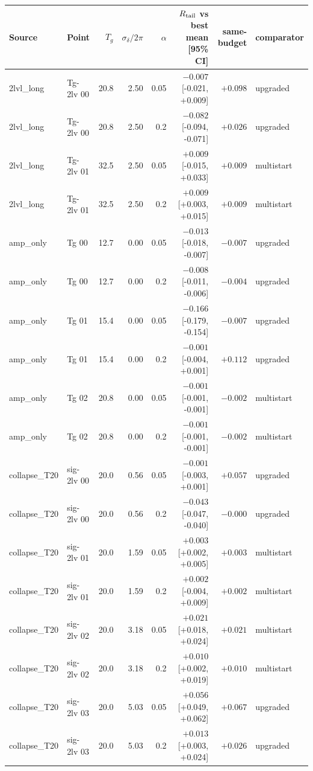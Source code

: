 \begin{longtable}{@{}llrrrrrl@{}}
\toprule
Source & Point & $T_g$ & $\sigma_\delta/2\pi$ & $\alpha$ & $R_{\rm tail}$ vs best mean [95\% CI] & same-budget & comparator\\
\midrule
\endhead
2lvl\_long & Tg-2lv 00 & 20.8 & 2.50 & 0.05 & $-0.007$ [-0.021, +0.009] & $+0.098$ & upgraded\\
2lvl\_long & Tg-2lv 00 & 20.8 & 2.50 & 0.2 & $-0.082$ [-0.094, -0.071] & $+0.026$ & upgraded\\
2lvl\_long & Tg-2lv 01 & 32.5 & 2.50 & 0.05 & $+0.009$ [-0.015, +0.033] & $+0.009$ & multistart\\
2lvl\_long & Tg-2lv 01 & 32.5 & 2.50 & 0.2 & $+0.009$ [+0.003, +0.015] & $+0.009$ & multistart\\
amp\_only & Tg 00 & 12.7 & 0.00 & 0.05 & $-0.013$ [-0.018, -0.007] & $-0.007$ & upgraded\\
amp\_only & Tg 00 & 12.7 & 0.00 & 0.2 & $-0.008$ [-0.011, -0.006] & $-0.004$ & upgraded\\
amp\_only & Tg 01 & 15.4 & 0.00 & 0.05 & $-0.166$ [-0.179, -0.154] & $-0.007$ & upgraded\\
amp\_only & Tg 01 & 15.4 & 0.00 & 0.2 & $-0.001$ [-0.004, +0.001] & $+0.112$ & upgraded\\
amp\_only & Tg 02 & 20.8 & 0.00 & 0.05 & $-0.001$ [-0.001, -0.001] & $-0.002$ & multistart\\
amp\_only & Tg 02 & 20.8 & 0.00 & 0.2 & $-0.001$ [-0.001, -0.001] & $-0.002$ & multistart\\
collapse\_T20 & sig-2lv 00 & 20.0 & 0.56 & 0.05 & $-0.001$ [-0.003, +0.001] & $+0.057$ & upgraded\\
collapse\_T20 & sig-2lv 00 & 20.0 & 0.56 & 0.2 & $-0.043$ [-0.047, -0.040] & $-0.000$ & upgraded\\
collapse\_T20 & sig-2lv 01 & 20.0 & 1.59 & 0.05 & $+0.003$ [+0.002, +0.005] & $+0.003$ & multistart\\
collapse\_T20 & sig-2lv 01 & 20.0 & 1.59 & 0.2 & $+0.002$ [-0.004, +0.009] & $+0.002$ & multistart\\
collapse\_T20 & sig-2lv 02 & 20.0 & 3.18 & 0.05 & $+0.021$ [+0.018, +0.024] & $+0.021$ & multistart\\
collapse\_T20 & sig-2lv 02 & 20.0 & 3.18 & 0.2 & $+0.010$ [+0.002, +0.019] & $+0.010$ & multistart\\
collapse\_T20 & sig-2lv 03 & 20.0 & 5.03 & 0.05 & $+0.056$ [+0.049, +0.062] & $+0.067$ & upgraded\\
collapse\_T20 & sig-2lv 03 & 20.0 & 5.03 & 0.2 & $+0.013$ [+0.003, +0.024] & $+0.026$ & upgraded\\

\end{longtable}
